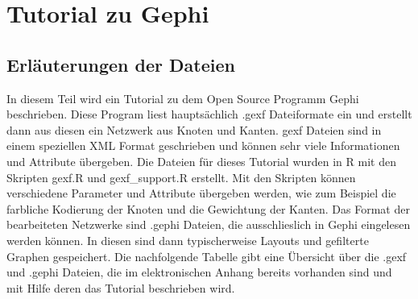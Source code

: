 \section{Tutorial zu Gephi}\label{tutorial}
\subsection*{Erläuterungen der Dateien}
In diesem Teil wird ein Tutorial zu dem Open Source Programm Gephi beschrieben. Diese Program liest hauptsächlich .gexf Dateiformate ein und erstellt dann aus diesen ein Netzwerk aus Knoten und Kanten. gexf Dateien sind in einem speziellen XML Format geschrieben und können sehr viele Informationen und Attribute übergeben. Die Dateien für dieses Tutorial wurden in R mit den Skripten gexf.R und gexf\_support.R erstellt. Mit den Skripten können verschiedene Parameter und Attribute übergeben werden, wie zum Beispiel die farbliche Kodierung der Knoten und die Gewichtung der Kanten. Das Format der bearbeiteten Netzwerke sind .gephi Dateien, die ausschlieslich in Gephi eingelesen werden können. In diesen sind dann typischerweise Layouts und gefilterte Graphen gespeichert. Die nachfolgende Tabelle gibt eine Übersicht über die .gexf und .gephi Dateien, die im elektronischen Anhang bereits vorhanden sind und mit Hilfe deren das Tutorial beschrieben wird.


